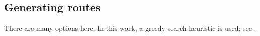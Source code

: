 \documentclass[11pt]{article}
\theoremstyle{definition}
\newcommand{\0}{\mathbf{0}}
\begin{document}
\subsection{Generating routes}
There are many options here.
In this work, a greedy search heuristic is used;
see \cite{harwood2021formulating}.


\end{document}
